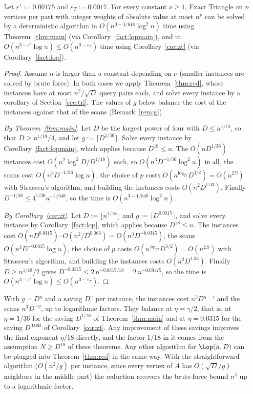 \begin{theorem}\label{thm:zwt}
Let $\varepsilon':=0.00175$ and $\varepsilon_T:=0.0017$. For every constant $\nu\ge1$, Exact Triangle on $n$ vertices per part with integer weights of absolute value at most $n^\nu$ can be solved by a deterministic algorithm in $O(n^{3-1/648}\log^2n)$ time using Theorem~\ref{thm:main} (via Corollary~\ref{fact:lopmain}), and in $O(n^{3-\varepsilon'}\log n)\leq O(n^{3-\varepsilon_T})$ time using Corollary~\ref{cor:zt} (via Corollary~\ref{fact:lop}).
\end{theorem}
\begin{proof}
Assume $n$ is larger than a constant depending on $\nu$ (smaller instances are solved by brute force). In both cases we apply Theorem~\ref{thm:red}, whose instances have at most $n^2/\sqrt D$ query pairs each, and solve every instance by a corollary of Section~\ref{sec:tri}. The values of $g$ below balance the cost of the instances against that of the scans (Remark~\ref{rem:g}).

\emph{By Theorem~\ref{thm:main}.} Let $D$ be the largest power of four with $D\le n^{1/18}$, so that $D\ge n^{1/18}/4$, and let $g:=\lceil D^{1/36}\rceil$. Solve every instance by Corollary~\ref{fact:lopmain}, which applies because $D^{18}\le n$. The $O(nD^{1/36})$ instances cost $O(n^2\log^2\!D/D^{1/18})$ each, so $O(n^3D^{-1/36}\log^2n)$ in all, the scans cost $O(n^3D^{-1/36}\log n)$, the choice of $p$ costs $O(n^{\log_27}D^{3/2})=O(n^{2.9})$ with Strassen's algorithm, and building the instances costs $O(n^2D^{1.03})$. Finally $D^{-1/36}\le4^{1/36}n^{-1/648}$, so the time is $O(n^{3-1/648}\log^2n)$.

\emph{By Corollary~\ref{cor:zt}.} Let $D:=\lfloor n^{1/18}\rfloor$ and $g:=\lceil D^{0.0315}\rceil$, and solve every instance by Corollary~\ref{fact:lop}, which applies because $D^{18}\le n$. The instances cost $O(nD^{0.0315})\cdot O(n^2/D^{0.063})=O(n^3D^{-0.0315})$, the scans $O(n^3D^{-0.0315}\log n)$, the choice of $p$ costs $O(n^{\log_27}D^{3/2})=O(n^{2.9})$ with Strassen's algorithm, and building the instances costs $O(n^2D^{1.04})$. Finally $D\ge n^{1/18}/2$ gives $D^{-0.0315}\le2\,n^{-0.0315/18}=2\,n^{-0.00175}$, so the time is $O(n^{3-\varepsilon'}\log n)\leq O(n^{3-\varepsilon_T})$.
\end{proof}

\begin{remark}\label{rem:g}
With $g=D^\eta$ and a saving $D^{\gamma}$ per instance, the instances cost $n^3D^{\eta-\gamma}$ and the scans $n^3D^{-\eta}$, up to logarithmic factors. They balance at $\eta=\gamma/2$, that is, at $\eta=1/36$ for the saving $D^{1/18}$ of Theorem~\ref{thm:main} and at $\eta=0.0315$ for the saving $D^{0.063}$ of Corollary~\ref{cor:zt}. Any improvement of these savings improves the final exponent $\eta/18$ directly, and the factor $1/18$ in it comes from the assumption $N\ge D^{18}$ of these theorems. Any other algorithm for $\Lop(n,D)$ can be plugged into Theorem~\ref{thm:red} in the same way. With the straightforward algorithm ($O(n^2/g)$ per instance, since every vertex of $A$ has $O(\sqrt D/g)$ neighbors in the middle part) the reduction recovers the brute-force bound $n^3$ up to a logarithmic factor.
\end{remark}

